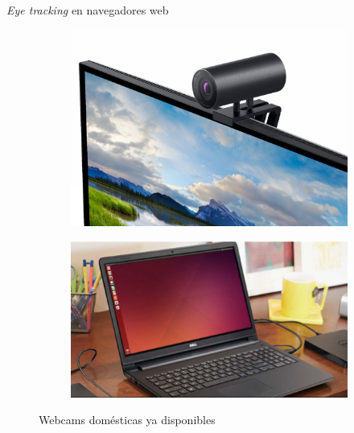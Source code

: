 \documentclass[aspectratio=169]{beamer}
\begin{document}
\begin{frame}{\textit{Eye tracking} en navegadores web}
  \begin{figure}
    \begin{subfigure}{0.49\textwidth}
      \centering
      \includegraphics[width=0.8\linewidth]{img/external-webcam.jpg}
    \end{subfigure}
    \begin{subfigure}{0.49\textwidth}
      \centering
      \includegraphics[width=0.8\linewidth]{img/notebook.jpg}
    \end{subfigure}
    \caption{Webcams domésticas ya disponibles}
  \end{figure}
\end{frame}
\end{document}
